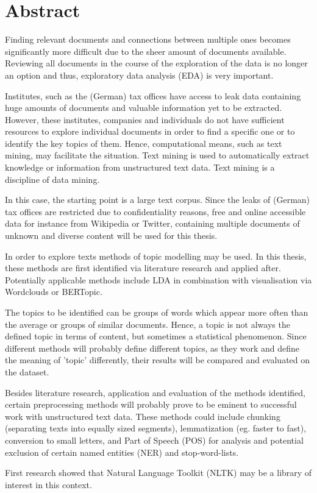 \chapter*{Abstract}



Finding relevant documents and connections between multiple ones becomes significantly more difficult due to the sheer amount of documents available.
Reviewing all documents in the course of the exploration of the data is no longer an option and thus, exploratory data analysis (EDA) is very important.

Institutes, such as the (German) tax offices have access to leak data containing huge amounts of documents and valuable information yet to be extracted.
However, these institutes, companies and individuals do not have sufficient resources to explore individual documents in order to find a specific one or to identify the key topics of them.
Hence, computational means, such as text mining, may facilitate the situation.
Text mining is used to automatically extract knowledge or information from unstructured text data.
Text mining is a discipline of data mining.

In this case, the starting point is a large text corpus.
Since the leaks of (German) tax offices are restricted due to confidentiality reasons, free and online accessible data for instance from Wikipedia or Twitter, containing multiple documents of unknown and diverse content will be used for this thesis.

In order to explore texts methods of topic modelling may be used.
In this thesis, these methods are first identified via literature research and applied after.
Potentially applicable methods include LDA in combination with visualisation via Wordclouds or BERTopic.


The topics to be identified can be groups of words which appear more often than the average or groups of similar documents.
Hence, a topic is not always the defined topic in terms of content, but sometimes a statistical phenomenon.
Since different methods will probably define different topics, as they work and define the meaning of 'topic' differently, their results will be compared and evaluated on the dataset.

Besides literature research, application and evaluation of the methods identified, certain preprocessing methods will probably prove to be eminent to successful work with unstructured text data.
These methods could include chunking (separating texts into equally sized segments), lemmatization (eg. faster to fast), conversion to small letters, and Part of Speech (POS) for analysis and potential exclusion of certain named entities (NER) and stop-word-lists.

First research showed that Natural Language Toolkit (NLTK) may be a library of interest in this context.